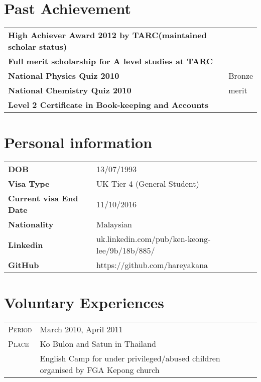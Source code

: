 \documentclass[a4paper, oneside, final]{scrartcl} %
\newcommand{\gray}{\rowcolor[gray]{.90}} %
\begin{document}
\begin{center}
\section{Past Achievement}
\begin{tabular}{ @{} >{\bfseries}l @{\hspace{6ex}} l }
High Achiever Award 2012 by TARC(maintained scholar status)\\
Full merit scholarship for A level studies at TARC\\
National Physics Quiz 2010 & Bronze\\
National Chemistry Quiz 2010 & merit\\
Level 2 Certificate in Book-keeping and Accounts\\
\end{tabular}

\normalsize
\section{Personal information}
\begin{tabular}{ @{} >{\bfseries}l @{\hspace{6ex}} l }
DOB & 13/07/1993\\
Visa Type & UK Tier 4 (General Student)\\
Current visa End Date & 11/10/2016\\
Nationality & Malaysian\\
Linkedin & uk.linkedin.com/pub/ken-keong-lee/9b/18b/885/\\
GitHub & https://github.com/hareyakana
\end{tabular}


\section{Voluntary Experiences}
\begin{tabularx}{0.97\linewidth}{>{\raggedleft\scshape}p{2cm}X}
\gray Period & March 2010, April 2011\\
\gray Place & Ko Bulon and Satun in Thailand\\
& \footnotesize{English Camp for under privileged/abused children organised by FGA Kepong church}
\end{tabularx}


\end{center}
\end{document}
